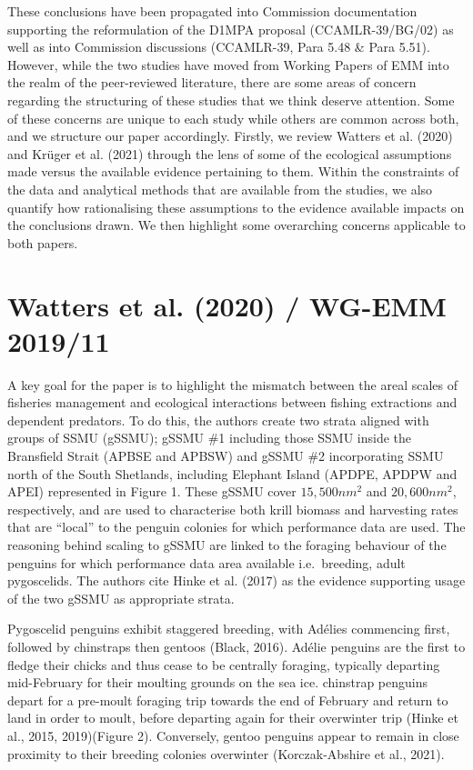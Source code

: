 \documentclass[]{elsarticle} %
\begin{document}
These conclusions have been propagated into Commission documentation
supporting the reformulation of the D1MPA proposal (CCAMLR-39/BG/02) as
well as into Commission discussions (CCAMLR-39, Para 5.48 \& Para 5.51).
However, while the two studies have moved from Working Papers of EMM
into the realm of the peer-reviewed literature, there are some areas of
concern regarding the structuring of these studies that we think deserve
attention. Some of these concerns are unique to each study while others
are common across both, and we structure our paper accordingly. Firstly,
we review Watters et al. (2020) and Krüger et al. (2021) through the
lens of some of the ecological assumptions made versus the available
evidence pertaining to them. Within the constraints of the data and
analytical methods that are available from the studies, we also quantify
how rationalising these assumptions to the evidence available impacts on
the conclusions drawn. We then highlight some overarching concerns
applicable to both papers.

\hypertarget{watters2020-wg-emm-201911}{%
\section{Watters et al. (2020) / WG-EMM
2019/11}\label{watters2020-wg-emm-201911}}

A key goal for the paper is to highlight the mismatch between the areal
scales of fisheries management and ecological interactions between
fishing extractions and dependent predators. To do this, the authors
create two strata aligned with groups of SSMU (gSSMU); gSSMU \#1
including those SSMU inside the Bransfield Strait (APBSE and APBSW) and
gSSMU \#2 incorporating SSMU north of the South Shetlands, including
Elephant Island (APDPE, APDPW and APEI) represented in Figure 1. These
gSSMU cover \(15,500nm^2\) and \(20,600nm^2\), respectively, and are
used to characterise both krill biomass and harvesting rates that are
``local'' to the penguin colonies for which performance data are used.
The reasoning behind scaling to gSSMU are linked to the foraging
behaviour of the penguins for which performance data area available
i.e.~breeding, adult pygoscelids. The authors cite Hinke et al. (2017)
as the evidence supporting usage of the two gSSMU as appropriate strata.

Pygoscelid penguins exhibit staggered breeding, with Adélies commencing
first, followed by chinstraps then gentoos (Black, 2016). Adélie
penguins are the first to fledge their chicks and thus cease to be
centrally foraging, typically departing mid-February for their moulting
grounds on the sea ice. chinstrap penguins depart for a pre-moult
foraging trip towards the end of February and return to land in order to
moult, before departing again for their overwinter trip (Hinke et al.,
2015, 2019)(Figure 2). Conversely, gentoo penguins appear to remain in
close proximity to their breeding colonies overwinter (Korczak-Abshire
et al., 2021).
\end{document}
